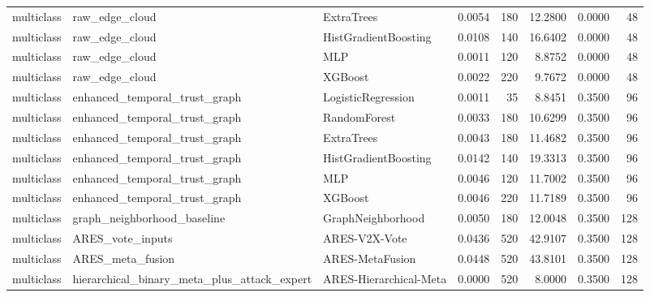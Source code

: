 \begin{table}[!t]
{\begin{tabular}{lllrrrrr}
multiclass & raw_edge_cloud & ExtraTrees & 0.0054 & 180 & 12.2800 & 0.0000 & 48 \\
multiclass & raw_edge_cloud & HistGradientBoosting & 0.0108 & 140 & 16.6402 & 0.0000 & 48 \\
multiclass & raw_edge_cloud & MLP & 0.0011 & 120 & 8.8752 & 0.0000 & 48 \\
multiclass & raw_edge_cloud & XGBoost & 0.0022 & 220 & 9.7672 & 0.0000 & 48 \\
multiclass & enhanced_temporal_trust_graph & LogisticRegression & 0.0011 & 35 & 8.8451 & 0.3500 & 96 \\
multiclass & enhanced_temporal_trust_graph & RandomForest & 0.0033 & 180 & 10.6299 & 0.3500 & 96 \\
multiclass & enhanced_temporal_trust_graph & ExtraTrees & 0.0043 & 180 & 11.4682 & 0.3500 & 96 \\
multiclass & enhanced_temporal_trust_graph & HistGradientBoosting & 0.0142 & 140 & 19.3313 & 0.3500 & 96 \\
multiclass & enhanced_temporal_trust_graph & MLP & 0.0046 & 120 & 11.7002 & 0.3500 & 96 \\
multiclass & enhanced_temporal_trust_graph & XGBoost & 0.0046 & 220 & 11.7189 & 0.3500 & 96 \\
multiclass & graph_neighborhood_baseline & GraphNeighborhood & 0.0050 & 180 & 12.0048 & 0.3500 & 128 \\
multiclass & ARES_vote_inputs & ARES-V2X-Vote & 0.0436 & 520 & 42.9107 & 0.3500 & 128 \\
multiclass & ARES_meta_fusion & ARES-MetaFusion & 0.0448 & 520 & 43.8101 & 0.3500 & 128 \\
multiclass & hierarchical_binary_meta_plus_attack_expert & ARES-Hierarchical-Meta & 0.0000 & 520 & 8.0000 & 0.3500 & 128 \\
\bottomrule
\end{tabular}

}
\end{table}